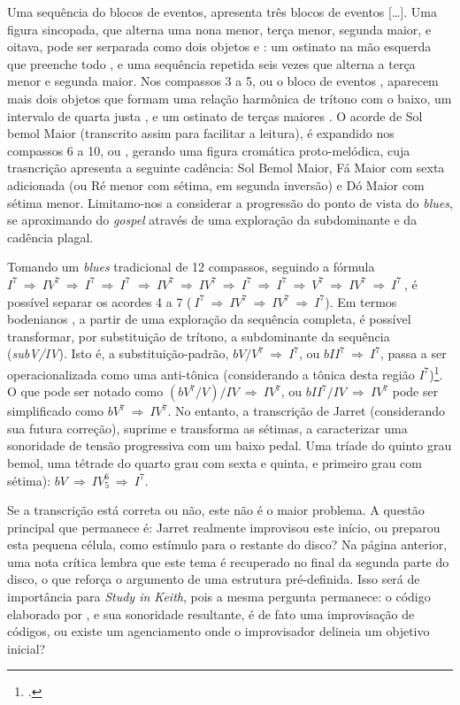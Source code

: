 Uma sequência do blocos de eventos,  apresenta três blocos de eventos $[$\ldots{}$]$. Uma figura sincopada, que alterna uma nona menor, terça menor, segunda maior, e oitava, pode ser serparada como dois objetos  e : um ostinato na mão esquerda que preenche todo , e uma sequência repetida seis vezes que alterna a terça menor e segunda maior. Nos compassos 3 a 5, ou o bloco de eventos , aparecem mais dois objetos que formam uma relação harmônica de trítono com o baixo, um intervalo de quarta justa , e um ostinato de terças maiores . O acorde de Sol bemol Maior (transcrito assim para facilitar a leitura), é expandido nos compassos 6 a 10, ou , gerando uma figura cromática proto-melódica, cuja trasncrição apresenta a seguinte cadência: Sol Bemol Maior, Fá Maior com sexta adicionada (ou Ré menor com sétima, em segunda inversão) e Dó Maior com sétima menor. Limitamo-nos a considerar a progressão do ponto de vista do \emph{blues}, se aproximando do \emph{gospel} através de uma exploração da subdominante e da cadência plagal. 

Tomando um \emph{blues} tradicional de 12 compassos, seguindo a fórmula $I^7~\Rightarrow~IV^7~\Rightarrow~I^7~\Rightarrow~I^7$ $\Rightarrow~IV^7~\Rightarrow~IV^7~\Rightarrow~I^7~\Rightarrow~I^7~\Rightarrow~V^7~\Rightarrow~IV^7~\Rightarrow~I^7~$, é possível separar os acordes 4 a 7 ($~I^7~\Rightarrow~IV^7~\Rightarrow~IV^7~\Rightarrow~I^7$). Em termos bodenianos , a partir de uma exploração da sequência completa, é possível transformar, por substituição de trítono, a subdominante da sequência (\emph{subV/IV}). Isto é, a substituição-padrão, $bV/V^7~\Rightarrow~I^7$, ou $bII^7~\Rightarrow~I^7$, passa a ser operacionalizada como uma anti-tônica (considerando a tônica desta região $I^7$)\footnote{.}.  O que pode ser notado como $(bV^7/V)/IV~\Rightarrow~IV^7$, ou $bII^7/IV~\Rightarrow~IV^7$  pode ser simplificado como $bV^7~\Rightarrow~IV^7$. No entanto, a transcrição de Jarret (considerando sua futura correção), suprime e transforma as sétimas, a caracterizar uma sonoridade de tensão progressiva com um baixo pedal. Uma tríade do quinto grau bemol, uma tétrade do quarto grau com sexta e quinta, e primeiro grau com sétima):  $bV~\Rightarrow~IV^6_5~\Rightarrow~I^7$.

Se a transcrição está correta ou não, este não é o maior problema. A questão principal que permanece é: Jarret realmente improvisou este início, ou preparou esta pequena célula, como estímulo para o restante do disco? Na página anterior, uma nota crítica lembra que este tema é recuperado no final da segunda parte do disco, o que reforça o argumento de uma estrutura pré-definida. Isso será de importância para \emph{Study in Keith}, pois a mesma pergunta permanece: o código elaborado por , e sua sonoridade resultante, é de fato uma improvisação de códigos, ou existe um agenciamento onde o improvisador delineia um objetivo inicial?

